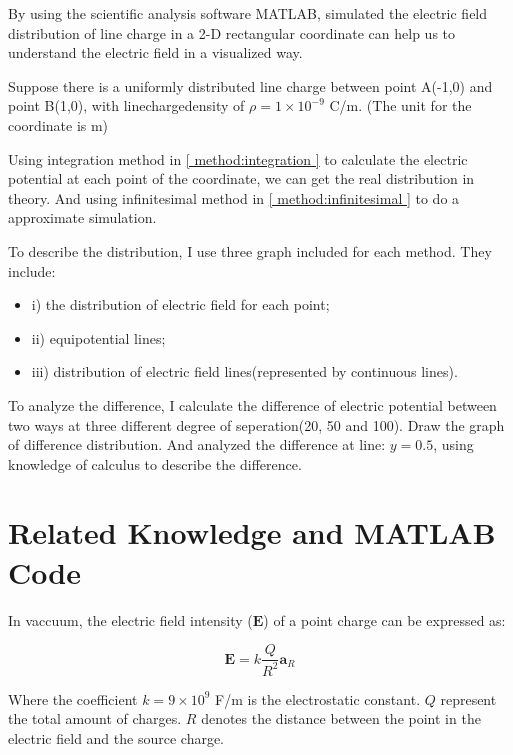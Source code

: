 \documentclass[10pt, journal, final]{IEEEtran}
\begin{document}
By using the scientific analysis software MATLAB,
simulated the electric field distribution of
line charge in a 2-D rectangular coordinate can help us to
understand the electric field in a visualized way.\par

Suppose there is a uniformly distributed line charge
between point A(-1,0) and point B(1,0),
with linechargedensity of $\rho = 1 \times 10^{-9}$ C/m.
(The unit for the coordinate is m)\par

Using integration method in \ref{ method:integration }
to calculate the electric potential at each point of the coordinate,
we can get the real distribution in theory.
And using infinitesimal method in \ref{ method:infinitesimal }
to do a approximate simulation.\par

To describe the distribution, I use three graph included for each method.
They include:
\begin{itemize}
    \item i)   the distribution of electric field for each point;
    \item ii)  equipotential lines;
    \item iii) distribution of electric field lines(represented by continuous lines).
\end{itemize}\par
To analyze the difference, I calculate the difference of electric potential
between two ways at three different degree of seperation(20, 50 and 100).
Draw the graph of difference distribution.
And analyzed the difference at line: $y=0.5$,
using knowledge of calculus to describe the difference.

\section{
  Related Knowledge and MATLAB Code
 }
\label{sec:Related and Code}

In vaccuum, the electric field intensity ($\mathbf{E}$)
of a point charge can be expressed as:

\begin{equation}
    \mathbf{E} = k\frac{Q}{R^2}\mathbf{a}_R
\end{equation}

Where the coefficient $k = 9 \times 10^9$ F/m is the electrostatic constant.
$Q$ represent the total amount of charges. $R$ denotes the distance
between the point in the electric field and the source charge.\par
\end{document}
